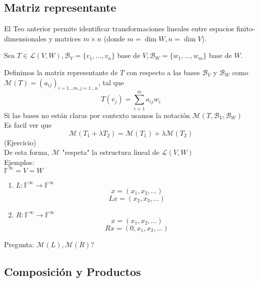 \documentclass[11pt]{book}
\theoremstyle{definition}
\begin{document}
\subsection{Matriz representante}

El Teo anterior permite identificar transformaciones lineales entre espacios finito-dimensionales y matrices $m\times n$ (donde $m=\dim W,n=\dim V$).

Sea $T\in\mathcal{L}(V,W),\mathcal{B}_V=\{v_1,...,v_n\}$ base de $V,\mathcal{B}_W=\{w_1,...,w_m\}$ base de $W$.

Definimos la matriz representante de $T$ con respecto a las bases $\mathcal{B}_V$ y $\mathcal{B}_W$ como $\mathcal{M}(T)=(a_{ij})_{i=1...m,j=1...n}$, tal que
\[
T(v_j)=\sum^m_{i=1}a_{ij}w_i
\]
Si las bases no están claras por contexto usamos la notación $\mathcal{M}(T,\mathcal{B}_V,\mathcal{B}_W)$\\
Es facil ver que
\[
\mathcal{M}(T_1+\lambda T_2)=\mathcal{M}(T_1)+\lambda\mathcal{M}(T_2)
\]
(Ejercicio)\\
De esta forma, $\mathcal{M}$ "respeta" la estructura lineal de $\mathcal{L}(V,W)$\\
Ejemplos:\\
$\mathbb{F}^\infty=V=W$
\begin{enumerate}
	\item $L:\mathbb{F}^\infty\rightarrow\mathbb{F}^\infty$
	\[
	x=(x_1,x_2,...)
	\]
	\[
	Lx=(x_2,x_3,...)
	\]
	
	\item $R:\mathbb{F}^\infty\rightarrow\mathbb{F}^\infty$
	\[
	x=(x_1,x_2,...)
	\]
	\[
	Rx=(0,x_1,x_2,...)
	\]
\end{enumerate}
Pregunta: $\mathcal{M}(L),\mathcal{M}(R)$?
\subsection{Composición y Productos}
\end{document}
